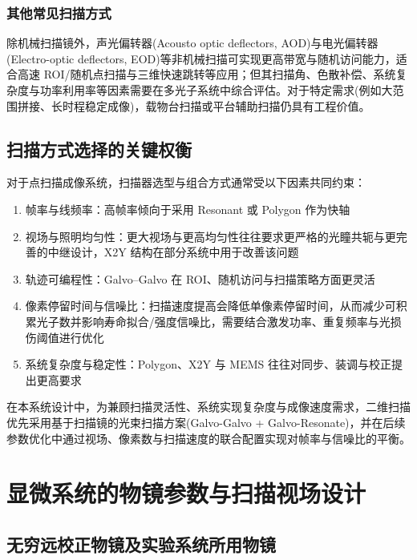\subsubsection{其他常见扫描方式}
除机械扫描镜外，声光偏转器(Acousto optic deflectors, AOD)与电光偏转器(Electro-optic deflectors, EOD)等非机械扫描可实现更高带宽与随机访问能力，适合高速 ROI/随机点扫描与三维快速跳转等应用；但其扫描角、色散补偿、系统复杂度与功率利用率等因素需要在多光子系统中综合评估。对于特定需求(例如大范围拼接、长时程稳定成像)，载物台扫描或平台辅助扫描仍具有工程价值。



\subsection{扫描方式选择的关键权衡}\label{2.3.3}
对于点扫描成像系统，扫描器选型与组合方式通常受以下因素共同约束：

\begin{enumerate}
    \item 帧率与线频率：高帧率倾向于采用 Resonant 或 Polygon 作为快轴
    \item 视场与照明均匀性：更大视场与更高均匀性往往要求更严格的光瞳共轭与更完善的中继设计，X2Y 结构在部分系统中用于改善该问题
    \item 轨迹可编程性：Galvo–Galvo 在 ROI、随机访问与扫描策略方面更灵活
    \item 像素停留时间与信噪比：扫描速度提高会降低单像素停留时间，从而减少可积累光子数并影响寿命拟合/强度信噪比，需要结合激发功率、重复频率与光损伤阈值进行优化
    \item 系统复杂度与稳定性：Polygon、X2Y 与 MEMS 往往对同步、装调与校正提出更高要求
\end{enumerate}

在本系统设计中，为兼顾扫描灵活性、系统实现复杂度与成像速度需求，二维扫描优先采用基于扫描镜的光束扫描方案(Galvo-Galvo + Galvo-Resonate)，并在后续参数优化中通过视场、像素数与扫描速度的联合配置实现对帧率与信噪比的平衡。



\section{显微系统的物镜参数与扫描视场设计}\label{2.4}

\subsection{无穷远校正物镜及实验系统所用物镜}\label{2.4.1}

